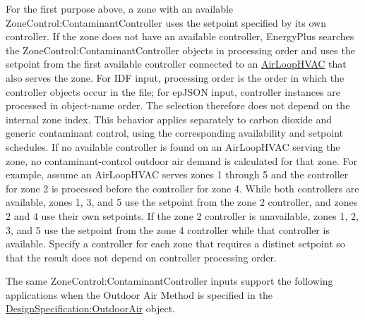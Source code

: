 For the first purpose above, a zone with an available ZoneControl:ContaminantController uses the setpoint specified by its own controller. If the zone does not have an available controller, EnergyPlus searches the ZoneControl:ContaminantController objects in processing order and uses the setpoint from the first available controller connected to an \hyperref[airloophvac]{AirLoopHVAC} that also serves the zone. For IDF input, processing order is the order in which the controller objects occur in the file; for epJSON input, controller instances are processed in object-name order. The selection therefore does not depend on the internal zone index. This behavior applies separately to carbon dioxide and generic contaminant control, using the corresponding availability and setpoint schedules. If no available controller is found on an AirLoopHVAC serving the zone, no contaminant-control outdoor air demand is calculated for that zone. For example, assume an AirLoopHVAC serves zones 1 through 5 and the controller for zone 2 is processed before the controller for zone 4. While both controllers are available, zones 1, 3, and 5 use the setpoint from the zone 2 controller, and zones 2 and 4 use their own setpoints. If the zone 2 controller is unavailable, zones 1, 2, 3, and 5 use the setpoint from the zone 4 controller while that controller is available. Specify a controller for each zone that requires a distinct setpoint so that the result does not depend on controller processing order.

The same ZoneControl:ContaminantController inputs support the following applications when the Outdoor Air Method is specified in the \hyperref[designspecificationoutdoorair]{DesignSpecification:OutdoorAir} object.

